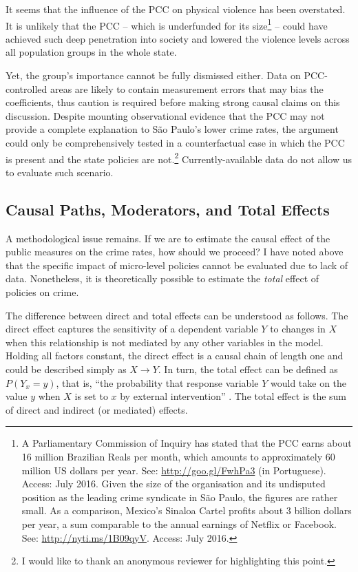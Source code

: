 It seems that the influence of the PCC on physical violence has been overstated. It is unlikely that the PCC -- which is underfunded for its size\footnote{A Parliamentary Commission of Inquiry has stated that the PCC earns about 16 million Brazilian Reals per month, which amounts to approximately 60 million US dollars per year. See: \url{http://goo.gl/FwhPa3} (in Portuguese). Access: July 2016. Given the size of the organisation and its undisputed position as the leading crime syndicate in São Paulo, the figures are rather small. As a comparison, Mexico's Sinaloa Cartel profits about 3 billion dollars per year, a sum comparable to the annual earnings of Netflix or Facebook. See: \url{http://nyti.ms/1B09qyV}. Access: July 2016.} -- could have achieved such deep penetration into society and lowered the violence levels across all population groups in the whole state. 

Yet, the group's importance cannot be fully dismissed either. Data on PCC-controlled areas are likely to contain measurement errors that may bias the coefficients, thus caution is required before making strong causal claims on this discussion. Despite mounting observational evidence that the PCC may not provide a complete explanation to São Paulo's lower crime rates, the argument could only be comprehensively tested in a counterfactual case in which the PCC is present and the state policies are not.\footnote{I would like to thank an anonymous reviewer for highlighting this point.} Currently-available data do not allow us to evaluate such scenario.

\subsection{Causal Paths, Moderators, and Total Effects}
\label{sub:causal_paths_moderators_and_total_effects}

A methodological issue remains. If we are to estimate the causal effect of the public measures on the crime rates, how should we proceed? I have noted above that the specific impact of micro-level policies cannot be evaluated due to lack of data. Nonetheless, it is theoretically possible to estimate the \emph{total} effect of policies on crime. 

The difference between direct and total effects can be understood as follows. The direct effect captures the sensitivity of a dependent variable $Y$ to changes in $X$ when this relationship is not mediated by any other variables in the model. Holding all factors constant, the direct effect is a causal chain of length one \citep[160]{sobel1987direct} and could be described simply as $X \rightarrow Y$. In turn, the total effect can be defined as $P(Y_{x} = y)$, that is, ``the probability that response variable $Y$ would take on the value $y$ when $X$ is set to $x$ by external intervention'' \citep[1572]{pearl2001direct}. The total effect is the sum of direct and indirect (or mediated) effects. 

